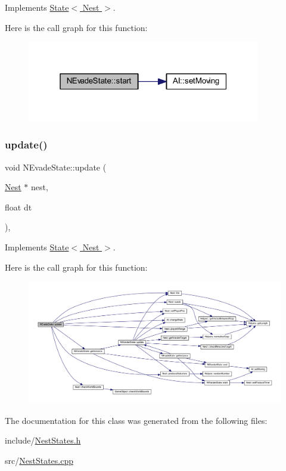 Implements \hyperlink{class_state_abc29d36b0462a306ac9b32f36571d783}{State$<$ Nest $>$}.

Here is the call graph for this function\+:
\nopagebreak
\begin{figure}[H]
\begin{center}
\leavevmode
\includegraphics[width=289pt]{class_n_evade_state_a4df3fb4c1325d9546ff1f659086d4f38_cgraph}
\end{center}
\end{figure}
\mbox{\label{class_n_evade_state_a9f4c58b444e53f79c9be0ebd85bf63a2}} 
\subsubsection{\texorpdfstring{update()}{update()}}
{\footnotesize\ttfamily void N\+Evade\+State\+::update (\begin{DoxyParamCaption}\item[{\hyperlink{class_nest}{Nest} $\ast$}]{nest,  }\item[{float}]{dt }\end{DoxyParamCaption})\hspace{0.3cm}{\ttfamily [override]}, {\ttfamily [virtual]}}



Implements \hyperlink{class_state_a30b5f87ed3e3a05fafeaf898e43518ea}{State$<$ Nest $>$}.

Here is the call graph for this function\+:
\nopagebreak
\begin{figure}[H]
\begin{center}
\leavevmode
\includegraphics[width=350pt]{class_n_evade_state_a9f4c58b444e53f79c9be0ebd85bf63a2_cgraph}
\end{center}
\end{figure}


The documentation for this class was generated from the following files\+:\begin{DoxyCompactItemize}
\item 
include/\hyperlink{_nest_states_8h}{Nest\+States.\+h}\item 
src/\hyperlink{_nest_states_8cpp}{Nest\+States.\+cpp}\end{DoxyCompactItemize}
